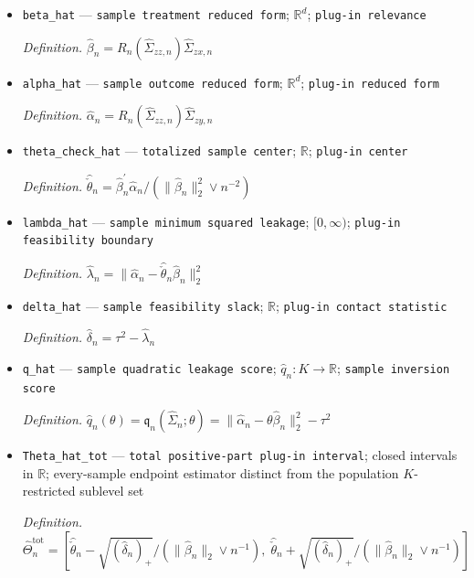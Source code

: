 \documentclass{article}
\begin{document}
\begin{itemize}
  \par\smallskip\noindent\emph{Definition.} \(\mathfrak q_n(S;\theta)=\|R_n(S_{zz})(S_{zy}-\theta S_{zx})\|_2^2-\tau^2\)
  \item \texttt{beta\_\allowbreak{}hat} --- \texttt{sample treatment reduced form}; \(\mathbb R^d\); \texttt{plug-\allowbreak{}in relevance}
  \par\smallskip\noindent\emph{Definition.} \(\widehat\beta_n=R_n(\widehat\Sigma_{zz,n})\widehat\Sigma_{zx,n}\)
  \item \texttt{alpha\_\allowbreak{}hat} --- \texttt{sample outcome reduced form}; \(\mathbb R^d\); \texttt{plug-\allowbreak{}in reduced form}
  \par\smallskip\noindent\emph{Definition.} \(\widehat\alpha_n=R_n(\widehat\Sigma_{zz,n})\widehat\Sigma_{zy,n}\)
  \item \texttt{theta\_\allowbreak{}check\_\allowbreak{}hat} --- \texttt{totalized sample center}; \(\mathbb R\); \texttt{plug-\allowbreak{}in center}
  \par\smallskip\noindent\emph{Definition.} \(\widehat{\check\theta}_n=\widehat\beta_n^{\prime}\widehat\alpha_n/(\|\widehat\beta_n\|_2^2\vee n^{-2})\)
  \item \texttt{lambda\_\allowbreak{}hat} --- \texttt{sample minimum squared leakage}; \([0,\infty)\); \texttt{plug-\allowbreak{}in feasibility boundary}
  \par\smallskip\noindent\emph{Definition.} \(\widehat\lambda_n=\|\widehat\alpha_n-\widehat{\check\theta}_n\widehat\beta_n\|_2^2\)
  \item \texttt{delta\_\allowbreak{}hat} --- \texttt{sample feasibility slack}; \(\mathbb R\); \texttt{plug-\allowbreak{}in contact statistic}
  \par\smallskip\noindent\emph{Definition.} \(\widehat\delta_n=\tau^2-\widehat\lambda_n\)
  \item \texttt{q\_\allowbreak{}hat} --- \texttt{sample quadratic leakage score}; \(\widehat q_n:K\to\mathbb R\); \texttt{sample inversion score}
  \par\smallskip\noindent\emph{Definition.} \(\widehat q_n(\theta)=\mathfrak q_n(\widehat\Sigma_n;\theta)=\|\widehat\alpha_n-\theta\widehat\beta_n\|_2^2-\tau^2\)
  \item \texttt{Theta\_\allowbreak{}hat\_\allowbreak{}tot} --- \texttt{total positive-\allowbreak{}part plug-\allowbreak{}in interval}; closed intervals in \(\mathbb R\); every-sample endpoint estimator distinct from the population \(K\)-restricted sublevel set
  \par\smallskip\noindent\emph{Definition.} \(\widehat\Theta_n^{\mathrm{tot}}=[\widehat{\check\theta}_n-\sqrt{(\widehat\delta_n)_+}/(\|\widehat\beta_n\|_2\vee n^{-1}),\;\widehat{\check\theta}_n+\sqrt{(\widehat\delta_n)_+}/(\|\widehat\beta_n\|_2\vee n^{-1})]\)

\end{itemize}
\end{document}
